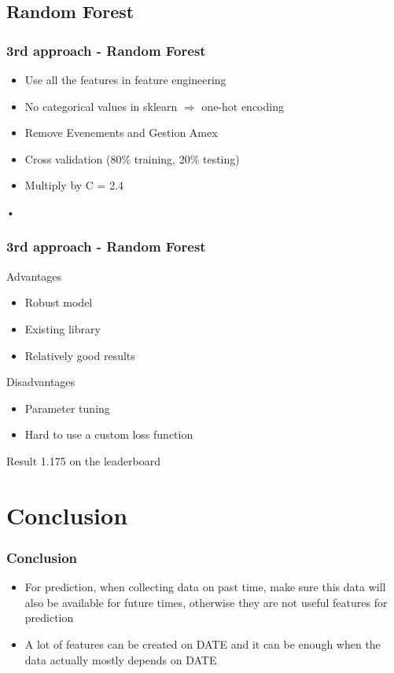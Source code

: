 \documentclass{beamer}
\begin{document}
\subsection{Random Forest}

\begin{frame}\frametitle{3rd approach - Random Forest}
\begin{itemize}
\item
Use all the features in feature engineering
\item
No categorical values in sklearn $\Rightarrow$ one-hot encoding
\item
Remove Evenements and Gestion Amex
\item
Cross validation (80\% training, 20\% testing)
\item
Multiply by C = 2.4
\end{itemize}•
\end{frame}

\begin{frame}\frametitle{3rd approach - Random Forest}
\begin{block}{Advantages}
\begin{itemize}
\item
Robust model
\item
Existing library
\item
Relatively good results
\end{itemize}
\end{block}
\begin{alertblock}{Disadvantages}
\begin{itemize}
\item
Parameter tuning
\item
Hard to use a custom loss function
\end{itemize}
\end{alertblock}
\begin{exampleblock}{Result}
1.175 on the leaderboard
\end{exampleblock}
\end{frame}

\section{Conclusion}

\begin{frame}\frametitle{Conclusion}
\begin{itemize}
\item
For prediction, when collecting data on past time, make sure this data will also be available for future times, otherwise they are not useful features for prediction
\item
A lot of features can be created on DATE and it can be enough when the data actually mostly depends on DATE
\end{itemize}
\end{frame}
\end{document}
